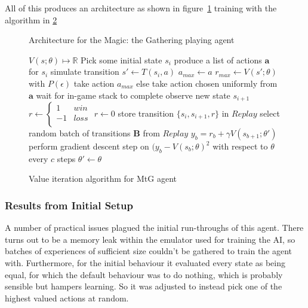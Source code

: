  All of this produces an architecture as shown in figure~\ref{fig:mtgarch} training with the algorithm in \ref{alg:mtgval}
  \begin{figure}[htbf]
  \centering

\caption{Architecture for the Magic: the Gathering playing agent}
\label{fig:mtgarch}
\end{figure}

 \begin{figure}[htbf]
 \centering
 \begin{minipage}{.7\textwidth}
 \begin{algorithmic}
 \State $V(s; \theta) \mapsto \mathbb{R} $
 \Repeat
    \State Pick some initial state $s_i$
    \Repeat	
     \State produce a list of actions $\mathbf{a}$ for $s_i$
     	\State simulate transition $s' \gets T(s_i, a)$
     		\State $a_{max} \gets a $
     		\State $r_{max} \gets V(s';\theta)$
     	\EndIf
     \EndFor
    \State with $P(\epsilon)$ take action $a_{max}$ 
    \State else take action chosen uniformly from $\mathbf{a}$
    \State wait for in-game stack to complete
    \State observe new state $s_{i+1}$
    	\State $r \gets \begin{cases}
			1 & win \\
			-1 & loss \\
			\end{cases} $
    \Else
    	\State $r \gets 0$
    \EndIf
    \State store transition $\{s_i , s_{i+1}, r\}$ in $Replay$
    \State select random batch of transitions $\mathbf{B}$ from $Replay$
    	\State $y_b = r_b + \gamma V(s_{b+1} ; \theta ')$
    	\State perform gradient descent step on $(y_b - V(s_b; \theta)^2$ with respect to $\theta$
    \EndFor 
    \State every $c$ steps $\theta ' \gets \theta$
 \end{algorithmic}
 \end{minipage}
\caption{Value iteration algorithm for MtG agent}
 \label{alg:mtgval}
\end{figure}
 

 \subsubsection{Results from Initial Setup}
A number of practical issues plagued the initial run-throughs of this agent. There turns out to be a memory leak within the emulator used for training the AI, so batches of experiences of sufficient size couldn't be gathered to train the agent with. Furthermore, for the initial  behaviour it evaluated every state as being equal, for which the default behaviour was to do nothing, which is probably sensible but hampers learning. So it was adjusted to instead pick one of the highest valued actions at random. 

